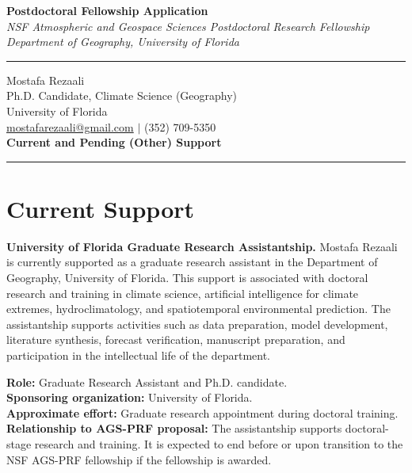 \documentclass[11pt,letterpaper]{article}
\begin{document}
\begin{center}
    \vspace*{-1.5cm}
    {\Large\bfseries Postdoctoral Fellowship Application} \\[0.2cm]
    {\small\textit{NSF Atmospheric and Geospace Sciences Postdoctoral Research Fellowship}} \\[0.05cm]
    {\small\textit{Department of Geography, University of Florida}} \\[0.1cm]
    \rule{0.6\textwidth}{0.4pt}
\end{center}
\vspace{-0.5cm}

\noindent
Mostafa Rezaali \\
Ph.D. Candidate, Climate Science (Geography) \\
University of Florida \\
\href{mailto:mostafarezaali@gmail.com}{mostafarezaali@gmail.com} \quad $\mid$ \quad (352) 709-5350 \\[0.3cm]
{\large\bfseries Current and Pending (Other) Support}\\[-0.15cm]
\rule{\textwidth}{0.4pt}
\section*{Current Support}
\textbf{University of Florida Graduate Research Assistantship.} Mostafa Rezaali is currently supported as a graduate research assistant in the Department of Geography, University of Florida. This support is associated with doctoral research and training in climate science, artificial intelligence for climate extremes, hydroclimatology, and spatiotemporal environmental prediction. The assistantship supports activities such as data preparation, model development, literature synthesis, forecast verification, manuscript preparation, and participation in the intellectual life of the department.

\noindent\textbf{Role:} Graduate Research Assistant and Ph.D. candidate.\\
\textbf{Sponsoring organization:} University of Florida.\\
\textbf{Approximate effort:} Graduate research appointment during doctoral training.\\
\textbf{Relationship to AGS-PRF proposal:} The assistantship supports doctoral-stage research and training. It is expected to end before or upon transition to the NSF AGS-PRF fellowship if the fellowship is awarded.
\end{document}
